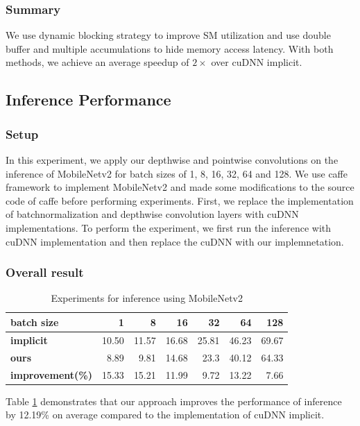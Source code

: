 \subsubsection{Summary} We use dynamic blocking strategy to improve SM utilization and use double buffer and multiple accumulations to hide memory access latency. With both methods, we achieve an average speedup of $2\times$ over cuDNN implicit.


\subsection{Inference Performance}
\label{sec:inferexp}
\subsubsection{Setup} In this experiment, we apply our depthwise and pointwise convolutions on the inference of MobileNetv2 for batch sizes of 1, 8, 16, 32, 64 and 128.
We use caffe framework to implement MobileNetv2 and made some modifications to the source code of caffe before performing experiments. 
First, we replace the implementation of batchnormalization and depthwise convolution layers with cuDNN implementations. 
To perform the experiment, we first run the inference with cuDNN implementation and then replace the cuDNN with our implemnetation.

\subsubsection{Overall result}
\begin{table}[]
    \caption{Experiments for inference using MobileNetv2}
    \label{tab:infertime}
    \centering
    \begin{threeparttable}
    \begin{tabular}{l|rrrrrr}
    \toprule
    \textbf{batch} size& 1 & 8 & 16& 32 &64 & 128\\
    \midrule
    \textbf{implicit} & 10.50  & 11.57 & 16.68 & 25.81 &46.23 &69.67  \\
    \textbf{ours} &8.89   &9.81    & 14.68  & 23.3 &40.12 &64.33 \\
    \textbf{improvement(\%)} &15.33   &15.21    & 11.99  & 9.72 &13.22 &7.66 \\
    
    \bottomrule
    \end{tabular}
    \footnotesize
    \end{threeparttable}
    \vspace{-5mm}
\end{table}
Table \ref{tab:infertime} demonstrates that our approach improves the performance of inference by 12.19\% on average compared to the implementation of cuDNN implicit.